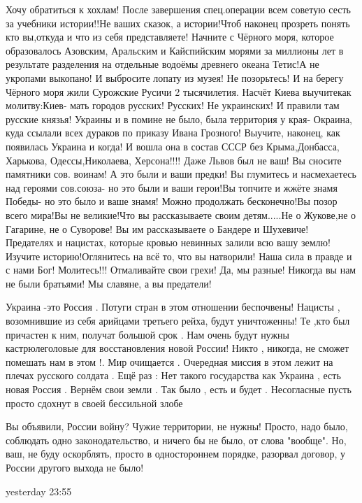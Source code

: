 Хочу обратиться к хохлам! После завершения спец.операции всем советую сесть за
учебники истории!!Не ваших сказок, а истории!Чтоб наконец прозреть понять кто
вы,откуда и что из себя представляете! Начните с Чёрного моря, которое
образовалось Азовским, Аральским и Кайспийским морями за миллионы лет в
результате разделения на отдельные водоёмы древнего океана Тетис!А не укропами
выкопано! И выбросите лопату из музея! Не позорьтесь! И на берегу Чёрного моря
жили Сурожские Русичи 2 тысячилетия. Насчёт Киева выучитекак молитву:Киев- мать
городов русских! Русских! Не украинских! И правили там русские князья! Украины
и в помине не было, была территория у края- Окраина, куда ссылали всех дураков
по приказу Ивана Грозного! Выучите, наконец, как появилась Украина и когда! И
вошла она в состав СССР без Крыма,Донбасса, Харькова, Одессы,Николаева,
Херсона!!!! Даже Львов был не ваш! Вы сносите памятники сов. воинам! А это были
и ваши предки! Вы глумитесь и насмехаетесь над героями сов.союза- но это были и
ваши герои!Вы топчите и жжёте знамя Победы- но это было и ваше знамя! Можно
продолжать бесконечно!Вы позор всего мира!Вы не великие!Что вы рассказываете
своим детям.....Не о Жукове,не о Гагарине, не о Суворове! Вы им рассказываете о
Бандере и Шухевиче! Предателях и нацистах, которые кровью невинных залили всю
вашу землю! Изучите историю!Оглянитесь на всё то, что вы натворили! Наша сила в
правде и с нами Бог! Молитесь!!! Отмаливайте свои грехи! Да, мы разные! Никогда
вы нам не были братьями! Мы славяне, а вы предатели!

Украина -это Россия . Потуги стран в этом отношении беспочвены! Нацисты ,
возомнившие из себя арийцами третьего рейха, будут уничтоженны! Те ,кто был
причастен к ним, получат большой срок . Нам очень будут нужны кастрюлеголовые
для восстановления новой России! Никто , никогда, не сможет помешать нам в этом
!. Мир очищается . Очередная миссия в этом лежит на плечах русского солдата .
Ещё раз : Нет такого государства как Украина , есть новая Россия . Вернём свои
земли . Так было , есть и будет . Несогласные пусть просто сдохнут в своей
бессильной злобе

Вы объявили, России войну?
Чужие территории, не нужны!
Просто, надо было, соблюдать одно законодательство, и ничего бы не было, от слова "вообще".
Но, ваш, не буду оскорблять, просто в одностороннем порядке, разорвал договор, у России другого выхода не было!

yesterday 23:55

